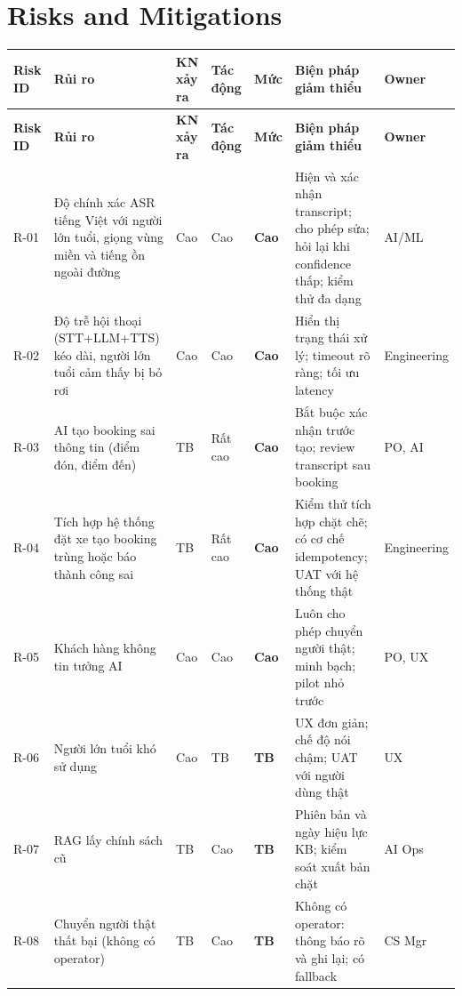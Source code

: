 \documentclass[12pt,a4paper]{article}
\newcommand{\riskhigh}{\colorbox{RiskHigh}{\small\textbf{Cao}}}
\newcommand{\riskmed}{\colorbox{RiskMed}{\small\textbf{TB}}}
\begin{document}
\section{Risks and Mitigations}

\small
\begin{longtable}{C{1.2cm} L{3cm} C{1.5cm} C{1.5cm} C{1.5cm} L{4cm} L{2cm}}
  \toprule
  \textbf{Risk ID}&\textbf{Rủi ro}&\textbf{KN xảy ra}&\textbf{Tác động}&\textbf{Mức}&\textbf{Biện pháp giảm thiểu}&\textbf{Owner}\\
  \midrule\endfirsthead\toprule{}\textbf{Risk ID}&\textbf{Rủi ro}&\textbf{KN xảy ra}&\textbf{Tác động}&\textbf{Mức}&\textbf{Biện pháp giảm thiểu}&\textbf{Owner}\\\midrule\endhead\bottomrule\endlastfoot
  R-01 & Độ chính xác ASR tiếng Việt với người lớn tuổi, giọng vùng miền và tiếng ồn ngoài đường & Cao & Cao & \riskhigh & Hiện và xác nhận transcript; cho phép sửa; hỏi lại khi confidence thấp; kiểm thử đa dạng & AI/ML \\
  R-02 & Độ trễ hội thoại (STT+LLM+TTS) kéo dài, người lớn tuổi cảm thấy bị bỏ rơi & Cao & Cao & \riskhigh & Hiển thị trạng thái xử lý; timeout rõ ràng; tối ưu latency & Engineering \\
  R-03 & AI tạo booking sai thông tin (điểm đón, điểm đến) & TB & Rất cao & \riskhigh & Bắt buộc xác nhận trước tạo; review transcript sau booking & PO, AI \\
  R-04 & Tích hợp hệ thống đặt xe tạo booking trùng hoặc báo thành công sai & TB & Rất cao & \riskhigh & Kiểm thử tích hợp chặt chẽ; có cơ chế idempotency; UAT với hệ thống thật & Engineering \\
  R-05 & Khách hàng không tin tưởng AI & Cao & Cao & \riskhigh & Luôn cho phép chuyển người thật; minh bạch; pilot nhỏ trước & PO, UX \\
  R-06 & Người lớn tuổi khó sử dụng & Cao & TB & \riskmed & UX đơn giản; chế độ nói chậm; UAT với người dùng thật & UX \\
  R-07 & RAG lấy chính sách cũ & TB & Cao & \riskmed & Phiên bản và ngày hiệu lực KB; kiểm soát xuất bản chặt & AI Ops \\
  R-08 & Chuyển người thật thất bại (không có operator) & TB & Cao & \riskmed & Không có operator: thông báo rõ và ghi lại; có fallback & CS Mgr \\

\end{longtable}
\end{document}
